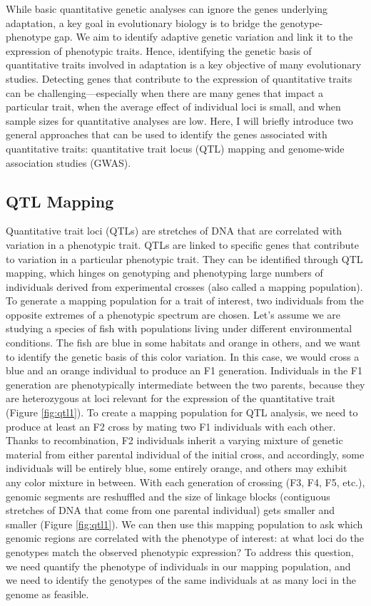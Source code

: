 \documentclass[
]{book}
\begin{document}
While basic quantitative genetic analyses can ignore the genes underlying adaptation, a key goal in evolutionary biology is to bridge the genotype-phenotype gap. We aim to identify adaptive genetic variation and link it to the expression of phenotypic traits. Hence, identifying the genetic basis of quantitative traits involved in adaptation is a key objective of many evolutionary studies. Detecting genes that contribute to the expression of quantitative traits can be challenging---especially when there are many genes that impact a particular trait, when the average effect of individual loci is small, and when sample sizes for quantitative analyses are low. Here, I will briefly introduce two general approaches that can be used to identify the genes associated with quantitative traits: quantitative trait locus (QTL) mapping and genome-wide association studies (GWAS).

\hypertarget{qtl-mapping}{%
\subsection{QTL Mapping}\label{qtl-mapping}}

Quantitative trait loci (QTLs) are stretches of DNA that are correlated with variation in a phenotypic trait. QTLs are linked to specific genes that contribute to variation in a particular phenotypic trait. They can be identified through QTL mapping, which hinges on genotyping and phenotyping large numbers of individuals derived from experimental crosses (also called a mapping population). To generate a mapping population for a trait of interest, two individuals from the opposite extremes of a phenotypic spectrum are chosen. Let's assume we are studying a species of fish with populations living under different environmental conditions. The fish are blue in some habitats and orange in others, and we want to identify the genetic basis of this color variation. In this case, we would cross a blue and an orange individual to produce an F1 generation. Individuals in the F1 generation are phenotypically intermediate between the two parents, because they are heterozygous at loci relevant for the expression of the quantitative trait (Figure \ref{fig:qtl1}). To create a mapping population for QTL analysis, we need to produce at least an F2 cross by mating two F1 individuals with each other. Thanks to recombination, F2 individuals inherit a varying mixture of genetic material from either parental individual of the initial cross, and accordingly, some individuals will be entirely blue, some entirely orange, and others may exhibit any color mixture in between. With each generation of crossing (F3, F4, F5, etc.), genomic segments are reshuffled and the size of linkage blocks (contiguous stretches of DNA that come from one parental individual) gets smaller and smaller (Figure \ref{fig:qtl1}). We can then use this mapping population to ask which genomic regions are correlated with the phenotype of interest: at what loci do the genotypes match the observed phenotypic expression? To address this question, we need quantify the phenotype of individuals in our mapping population, and we need to identify the genotypes of the same individuals at as many loci in the genome as feasible.
\end{document}
